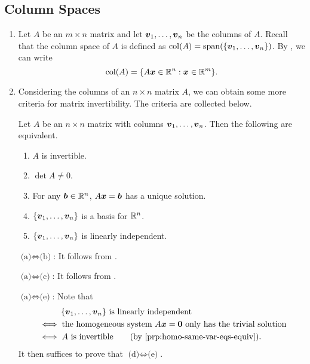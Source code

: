\subsection{Column Spaces}
\begin{enumerate}
\item Let \(A\) be an \(m\times n\) matrix and let
\(\vb*{v}_1,\dotsc,\vb*{v}_n\) be the columns of \(A\). Recall that the
column space of \(A\) is defined as
\(\operatorname{col}(A)=\operatorname{span}(\{\vb*{v}_1,\dotsc,\vb*{v}_n\})\). By
, we can write
\[
\operatorname{col}(A)=\{A\vb*{x}\in\mathbb{R}^n:\vb*{x}\in\mathbb{R}^m\}.
\]
\item Considering the columns of an \(n\times n\) matrix \(A\), we can obtain
some more criteria for matrix invertibility. The criteria are collected below.

\begin{theorem}
\label{thm:matx-inv-crit}
Let \(A\) be an \(n\times  n\) matrix with columns
\(\vb*{v}_1,\dotsc,\vb*{v}_n\). Then the following are equivalent.
\begin{enumerate}
\item \(A\) is invertible.
\item \(\det A\ne 0\).
\item For any \(\vb*{b}\in\mathbb{R}^n\), \(A\vb*{x}=\vb*{b}\) has a unique solution.
\item \(\{\vb*{v}_1,\dotsc,\vb*{v}_n\}\) is a basis for \(\mathbb{R}^n\).
\item \(\{\vb*{v}_1,\dotsc,\vb*{v}_n\}\) is linearly independent.
\end{enumerate}
\end{theorem}
\begin{pf}
\underline{\(\text{(a)}\iff\text{(b)}\)}: It follows from .

\underline{\(\text{(a)}\iff\text{(c)}\)}: It follows from .

\underline{\(\text{(a)}\iff\text{(e)}\)}: Note that
\begin{align*}
&\hspace{1cm}\text{\(\{\vect{v}_1,\dotsc,\vect{v}_n\}\) is linearly independent}\\
&\iff \text{the homogeneous system \(A\vect{x}=\vect{0}\) only has the trivial solution} \\
&\iff \text{\(A\) is invertible\qquad (by \Cref{prp:homo-same-var-eqs-equiv})}.
\end{align*}
It then suffices to prove that \(\text{(d)}\iff\text{(e)}\).


\end{pf}
\end{enumerate}
